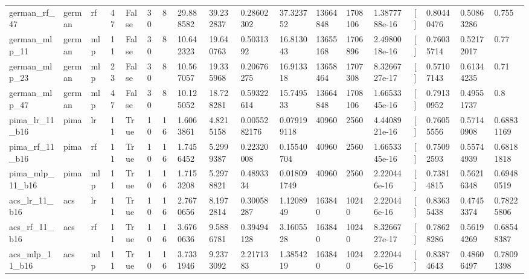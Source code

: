 \begin{tabular}{llllllllllllllllll}
german\_rf\_47 & german & rf & 47 & False & 30 & 8 & 29.888582 & 39.232837 & 0.28602302 & 37.323752 & 13664848 & 1708106 & 1.3877788e-16 & [] & 0.80440476 & 0.50863286 & 0.755 \\
german\_mlp\_11 & german & mlp & 11 & False & 30 & 8 & 10.642323 & 19.640763 & 0.5031392 & 16.813043 & 13655168 & 1706896 & 2.4980018e-16 & [] & 0.76035714 & 0.52172017 & 0.77 \\
german\_mlp\_23 & german & mlp & 23 & False & 30 & 8 & 10.567057 & 19.335968 & 0.20676275 & 16.913318 & 13658464 & 1707308 & 8.3266727e-17 & [] & 0.57107143 & 0.61344235 & 0.71 \\
german\_mlp\_47 & german & mlp & 47 & False & 30 & 8 & 10.125052 & 18.728281 & 0.59322614 & 15.749533 & 13664848 & 1708106 & 1.6653345e-16 & [] & 0.79130952 & 0.49551737 & 0.8 \\
pima\_lr\_11\_b16 & pima & lr & 11 & True & 10 & 16 & 1.6063861 & 4.8215158 & 0.0055282176 & 0.079199118 & 40960 & 2560 & 4.4408921e-16 & [] & 0.76055556 & 0.57140908 & 0.68831169 \\
pima\_rf\_11\_b16 & pima & rf & 11 & True & 10 & 16 & 1.7456452 & 5.2999387 & 0.22320008 & 0.15540704 & 40960 & 2560 & 1.6653345e-16 & [] & 0.75092593 & 0.55744939 & 0.68181818 \\
pima\_mlp\_11\_b16 & pima & mlp & 11 & True & 10 & 16 & 1.7153208 & 5.2978821 & 0.4893334 & 0.018091749 & 40960 & 2560 & 2.220446e-16 & [] & 0.73814815 & 0.56216348 & 0.69480519 \\
acs\_lr\_11\_b16 & acs & lr & 11 & True & 10 & 16 & 2.7670656 & 8.1972814 & 0.30058287 & 1.1208949 & 163840 & 10240 & 2.220446e-16 & [] & 0.83635438 & 0.47453374 & 0.78225806 \\
acs\_rf\_11\_b16 & acs & rf & 11 & True & 10 & 16 & 3.6760636 & 9.5886781 & 0.39494128 & 3.1605528 & 163840 & 10240 & 8.3266727e-17 & [] & 0.78628286 & 0.56194269 & 0.68548387 \\
acs\_mlp\_11\_b16 & acs & mlp & 11 & True & 10 & 16 & 3.7331946 & 9.2373092 & 2.2171383 & 1.3854219 & 163840 & 10240 & 2.220446e-16 & [] & 0.83874643 & 0.48606497 & 0.78091398 \\
\bottomrule
\end{tabular}
